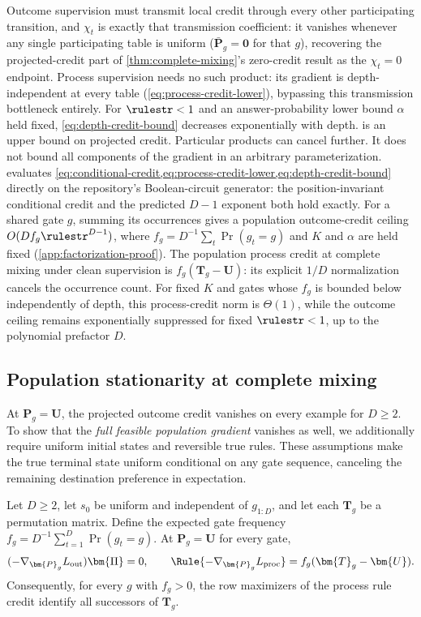 Outcome supervision must transmit local credit through every other
participating transition, and $\chi_t$ is exactly that transmission
coefficient: it vanishes whenever any single participating table is
uniform ($\bar{\bm P}_g=\bm 0$ for that $g$), recovering the projected-credit
part of \cref{thm:complete-mixing}'s zero-credit result as the
$\chi_t=0$ endpoint. Process supervision needs no such product: its
gradient is depth-independent at every table (\cref{eq:process-credit-lower}),
bypassing this transmission bottleneck entirely. For $\rulestr<1$ and an
answer-probability lower bound $\alpha$ held fixed, \cref{eq:depth-credit-bound}
decreases exponentially with depth.  is an
upper bound on projected credit. Particular products can cancel further.
It does not bound all components of the gradient in an arbitrary
parameterization.
 evaluates \cref{eq:conditional-credit,eq:process-credit-lower,eq:depth-credit-bound} directly on the repository's Boolean-circuit generator: the position-invariant conditional credit and the predicted $D-1$ exponent both hold exactly.
For a shared gate $g$, summing its occurrences gives a population
outcome-credit ceiling $O(D f_g\rulestr^{D-1})$, where
$f_g=D^{-1}\sum_t\Pr(g_t=g)$ and $K$ and $\alpha$ are held fixed
(\cref{app:factorization-proof}). The population process credit at complete
mixing under clean supervision is $f_g(\bm T_g-\bm U)$: its explicit
$1/D$ normalization cancels the occurrence count. For fixed $K$ and gates
whose $f_g$ is bounded below independently of depth, this process-credit
norm is $\Theta(1)$, while the outcome ceiling remains exponentially
suppressed for fixed $\rulestr<1$, up to the polynomial prefactor $D$.

\subsection{Population stationarity at complete mixing}

At $\bm{P}_g=\bm{U}$, the projected outcome credit vanishes on every example for $D\ge2$.
To show that the \emph{full feasible population gradient} vanishes as well,
we additionally require uniform initial states and reversible true rules.
These assumptions make the true terminal state uniform conditional on any gate
sequence, canceling the remaining destination preference in expectation.

\begin{theorem}
\label{thm:complete-mixing}
Let $D\ge2$, let $s_0$ be uniform and independent of $g_{1:D}$, and let each
$\bm{T}_g$ be a permutation matrix. Define the expected gate frequency
$f_g=D^{-1}\sum_{t=1}^D\Pr(g_t=g)$. At $\bm{P}_g=\bm{U}$ for every gate,
\begin{equation}
 (-\nabla_{\bm{P}_g}L_{\rm out})\bm{\Pi}=0,\qquad
 \Rule{-\nabla_{\bm{P}_g}L_{\rm proc}}=f_g(\bm{T}_g-\bm{U}).
 \label{eq:process-recovers-table}
\end{equation}
Consequently, for every $g$ with $f_g>0$, the row maximizers of the process
rule credit identify all successors of $\bm{T}_g$.
\end{theorem}

